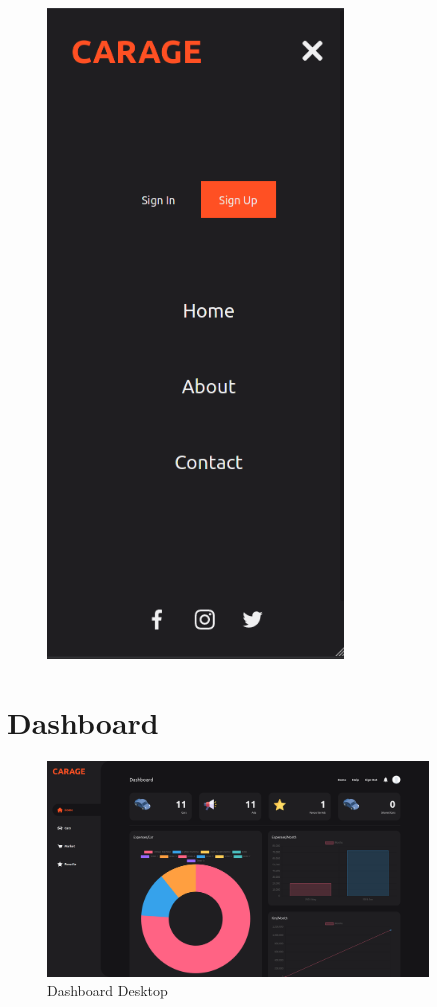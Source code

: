 \documentclass[a4paper]{report}
\begin{document}
\begin{figure}[H]
\begin{minipage}{.5\textwidth}
    \includegraphics[width=0.7\textwidth]{images/homepage_mobile_menu.png}
    \label{img:Frame40}
\end{minipage}%
\end{figure}

\section{Dashboard}

\begin{figure}[H]
    \centering
    \includegraphics[width=0.9\textwidth]{images/dashboard.png}
    \caption{Dashboard Desktop}
\end{figure}
\end{document}
